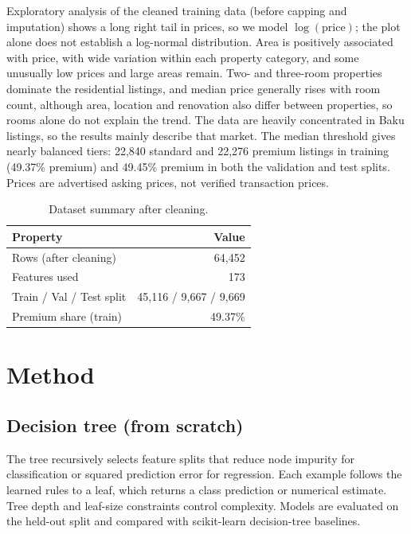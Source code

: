 \documentclass[10pt,twocolumn,a4paper]{article}
\begin{document}
Exploratory analysis of the cleaned training data (before capping and imputation)
shows a long right tail in prices, so we model $\log(\text{price})$; the plot
alone does not establish a log-normal distribution. Area is positively
associated with price, with wide variation within each property category, and
some unusually low prices and large areas remain. Two- and three-room
properties dominate the residential listings, and median price generally rises
with room count, although area, location and renovation also differ between
properties, so rooms alone do not explain the trend. The data are heavily
concentrated in Baku listings, so the results mainly describe that market. The
median threshold gives nearly balanced tiers: 22,840 standard and 22,276
premium listings in training (49.37\% premium) and 49.45\% premium in both the
validation and test splits. Prices are advertised asking prices, not verified
transaction prices.

\begin{table}[t]
  \centering
  \caption{Dataset summary after cleaning.}
  \label{tab:data}
  \begin{tabular}{@{}lr@{}}
    \toprule
    Property & Value \\
    \midrule
    Rows (after cleaning)       & 64,452 \\
    Features used               & 173 \\
    Train / Val / Test split    & 45,116 / 9,667 / 9,669 \\
    Premium share (train)       & 49.37\% \\
    \bottomrule
  \end{tabular}
\end{table}

\section{Method}
\subsection{Decision tree (from scratch)}
The tree recursively selects feature splits that reduce node impurity for classification or squared prediction error for regression. Each example follows the learned rules to a leaf, which returns a class prediction or numerical estimate. Tree depth and leaf-size constraints control complexity. Models are evaluated on the held-out split and compared with scikit-learn decision-tree baselines.
\end{document}
